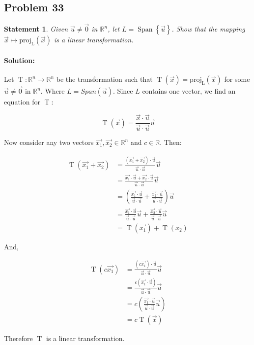 \documentclass[12pt, letterpaper]{article}
\newcommand{\R}{\mathbb{R}}
\theoremstyle{statement}
\theoremstyle{statement}
\newtheorem*{atmStat}{Statement}
\newenvironment{Solution}{\noindent\ignorespaces\paragraph{Solution:}}{\hfill \ding{122}\par\noindent}
\newcommand{\func}[2]{\operatorname{#1}(#2)}
\begin{document}
    \subsection*{Problem 33}
    \begin{atmStat}
    Given $\Vec{u}\neq\Vec{0}$ in $\R^n$, let $L=\operatorname{Span}\left\{\Vec{u}\right\}$. Show that the mapping $\Vec{x}\mapsto\operatorname{proj_L}(\Vec{x})$ is a linear transformation.
    \end{atmStat}
    \begin{Solution}
    Let $\operatorname{T}:\R^n\longrightarrow\R^n$ be the transformation such that $\operatorname{T}(\Vec{x})=\operatorname{proj_L}(\Vec{x})$ for some $\Vec{u}\neq\Vec{0}$ in $\R^n$. Where $L=Span(\Vec{u})$. Since $L$ contains one vector, we find an equation for $\operatorname{T}$:
    
    $$
    \operatorname{T}(\Vec{x})=\frac{\Vec{x}\cdot\Vec{u}}{\Vec{u}\cdot\Vec{u}}\Vec{u}
    $$
    
    Now consider any two vectors $\Vec{x_1}, \Vec{x_2}\in\R^n$ and $c\in\R$. Then: 
    
    \begin{align*}
        \func{T}{\Vec{x_1}+\Vec{x_2}} &= \frac{(\Vec{x_1}+\Vec{x_2})\cdot\Vec{u}}{\Vec{u}\cdot\Vec{u}}\Vec{u} \\ 
        &= \frac{\Vec{x_1}\cdot\Vec{u}+\Vec{x_2}\cdot\Vec{u}}{\Vec{u}\cdot\Vec{u}}\Vec{u} \\
        &= \left(\frac{\Vec{x_1}\cdot\Vec{u}}{\Vec{u}\cdot\Vec{u}} + \frac{\Vec{x_2}\cdot\Vec{u}}{\Vec{u}\cdot\Vec{u}}\right)\Vec{u} \\
        &= \frac{\Vec{x_1}\cdot\Vec{u}}{\Vec{u}\cdot\Vec{u}}\Vec{u}+\frac{\Vec{x_2}\cdot\Vec{u}}{\Vec{u}\cdot\Vec{u}}\Vec{u} \\
        &= \func{T}{\Vec{x_1}}+\func{T}{x_2} 
    \end{align*}
    
    And, 
    
    \begin{align*}
        \func{T}{c\Vec{x_1}} &= \frac{(c\Vec{x_1})\cdot\Vec{u}}{\Vec{u}\cdot\Vec{u}}\Vec{u} \\ 
        &= \frac{c(\Vec{x_1}\cdot\Vec{u})}{\Vec{u}\cdot\Vec{u}}\Vec{u} \\
        &= c\left(\frac{\Vec{x_1}\cdot\Vec{u}}{\Vec{u}\cdot\Vec{u}}\Vec{u}\right) \\
        &= c \func{T}{\Vec{x}}
    \end{align*}
    
    Therefore $\operatorname{T}$ is a linear transformation.
    \end{Solution}
    
\end{document}

